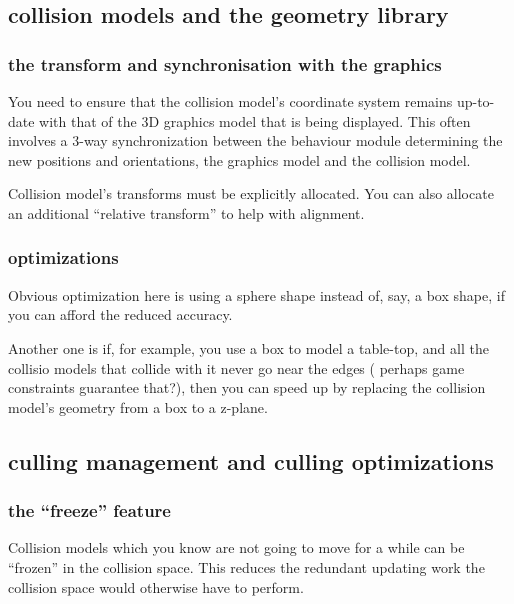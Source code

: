 \documentclass[11pt]{article}
\begin{document}
\subsection{ collision models and the geometry library }


\subsubsection{ the transform and synchronisation with the graphics }

You need to ensure that the collision model's coordinate system remains
up-to-date with that of the 3D graphics model that is being displayed. This
often involves a 3-way synchronization between the behaviour module
determining the new positions and orientations, the graphics model and the
collision model. 

Collision model's transforms must be explicitly allocated.
You can also allocate an additional ``relative transform'' to help with
alignment.

\subsubsection{ optimizations }

Obvious optimization here is using a sphere shape instead of, say, a box
shape, if you can afford the reduced accuracy.

Another one is if, for example, you use a box to model a table-top, and all
the collisio models that collide with it never go near the edges ( perhaps
game constraints guarantee that?), then you can speed up by replacing the
collision model's geometry from a box to a z-plane.

\subsection{ culling management and culling optimizations }

\subsubsection{ the ``freeze'' feature }

Collision models which you know are not going to move for a while can be
``frozen'' in the collision space. This reduces the redundant updating work
the collision space would otherwise have to perform.
\end{document}

